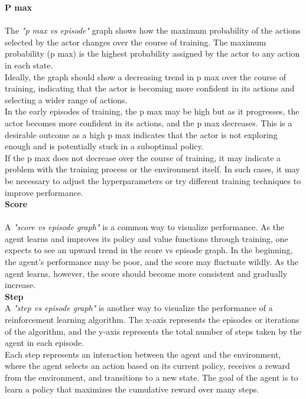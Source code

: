 \documentclass[conference]{IEEEtran}
\begin{document}
\textbf{P max}\\

\\ The \textit{"p max vs episode"} graph shows how the maximum probability of the actions selected by the actor changes over the course of training. The maximum probability (p max) is the highest probability assigned by the actor to any action in each state.\\

Ideally, the graph should show a decreasing trend in p max over the course of training, indicating that the actor is becoming more confident in its actions and selecting a wider range of actions.\\

In the early episodes of training, the p max may be high but as it progresses, the actor becomes more confident in its actions, and the p max decreases. This is a desirable outcome as a high p max indicates that the actor is not exploring enough and is potentially stuck in a suboptimal policy.\\
If the p max does not decrease over the course of training, it may indicate a problem with the training process or the environment itself. In such cases, it may be necessary to adjust the hyperparameters or try different training techniques to improve performance.\\

\textbf{Score}\\

\\ A \textit{"score vs episode graph"} is a common way to visualize performance. As the agent learns and improves its policy and value functions through training, one expects to see an upward trend in the score vs episode graph. In the beginning, the agent's performance may be poor, and the score may fluctuate wildly. As the agent learns, however, the score should become more consistent and gradually increase.\\

\textbf{Step}\\

A \textit{"step vs episode graph"} is another way to visualize the performance of a reinforcement learning algorithm. The x-axis represents the episodes or iterations of the algorithm, and the y-axis represents the total number of steps taken by the agent in each episode.\\

Each step represents an interaction between the agent and the environment, where the agent selects an action based on its current policy, receives a reward from the environment, and transitions to a new state. The goal of the agent is to learn a policy that maximizes the cumulative reward over many steps.\\
\end{document}
